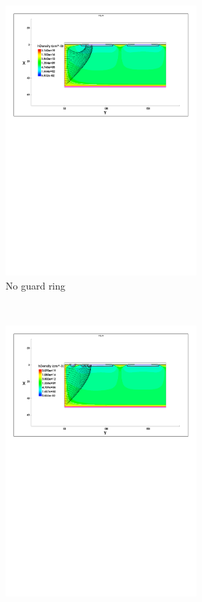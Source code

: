 \begin{figure}[htbp]
  \centering
  \begin{subfigure}[b]{\textwidth}
    \includegraphics[width=0.8\textwidth]{figures/ActiveEdge/streamlines_NGR.pdf}
    \caption{No guard ring}
  \end{subfigure}\\
  \begin{subfigure}[b]{\textwidth}
    \includegraphics[width=0.8\textwidth]{figures/ActiveEdge/streamlines_FGR.pdf}

\end{subfigure}
\end{figure}
